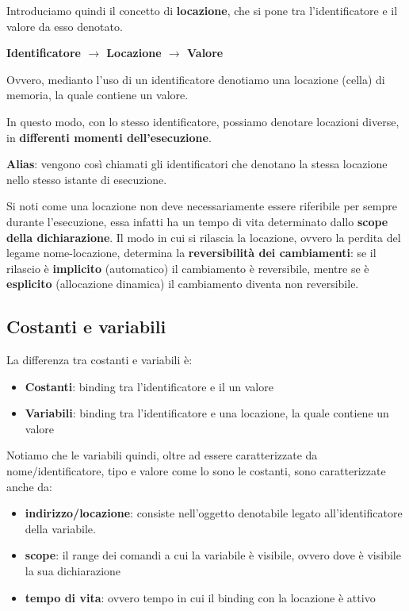 \documentclass[12pt,a4paper]{article}
\begin{document}
Introduciamo quindi il concetto di \textbf{locazione}, che si pone tra l'identificatore e il valore da esso denotato.

\begin{center}
\textbf{Identificatore $\rightarrow$ Locazione $\rightarrow$ Valore}
\end{center}

Ovvero, medianto l'uso di un identificatore denotiamo una locazione (cella) di memoria, la quale contiene un valore.

In questo modo, con lo stesso identificatore, possiamo denotare locazioni diverse, in \textbf{differenti momenti dell'esecuzione}.

\textbf{Alias}: vengono così chiamati gli identificatori che denotano la stessa locazione nello stesso istante di esecuzione.

Si noti come una locazione non deve necessariamente essere riferibile per sempre durante l'esecuzione, essa infatti ha un tempo di vita determinato dallo \textbf{scope della dichiarazione}. Il modo in cui si rilascia la locazione, ovvero la perdita del legame nome-locazione, determina la \textbf{reversibilità dei cambiamenti}: se il rilascio è \textbf{implicito} (automatico) il cambiamento è reversibile, mentre se è \textbf{esplicito} (allocazione dinamica) il cambiamento diventa non reversibile.

\subsection{Costanti e variabili}
La differenza tra costanti e variabili è:
\begin{itemize}
\item \textbf{Costanti}: binding tra l'identificatore e il un valore
\item \textbf{Variabili}: binding tra l'identificatore e una locazione, la quale contiene un valore
\end{itemize}
Notiamo che le variabili quindi, oltre ad essere caratterizzate da nome\slash identificatore, tipo e valore come lo sono le costanti, sono caratterizzate anche da:
\begin{itemize}
\item \textbf{indirizzo\slash locazione}: consiste nell'oggetto denotabile legato all'identificatore della variabile.
\item \textbf{scope}: il range dei comandi a cui la variabile è visibile, ovvero dove è visibile la sua dichiarazione
\item \textbf{tempo di vita}: ovvero tempo in cui il binding con la locazione è attivo
\end{itemize}
\end{document}
